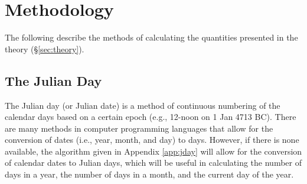 \section{Methodology}
\label{sec:methods}
The following describe the methods of calculating the quantities presented in the theory (\S \ref{sec:theory}).

\subsection{The Julian Day}
\label{sec:jday}
The Julian day (or Julian date) is a method of continuous numbering of the calendar days based on a certain epoch (e.g., 12-noon on 1 Jan 4713 BC). 
There are many methods in computer programming languages that allow for the conversion of dates (i.e., year, month, and day) to days. 
However, if there is none available, the algorithm given in Appendix \ref{app:jday} \parencite{meeus91} will allow for the conversion of calendar dates to Julian days, which will be useful in calculating the number of days in a year, the number of days in a month, and the current day of the year. 

